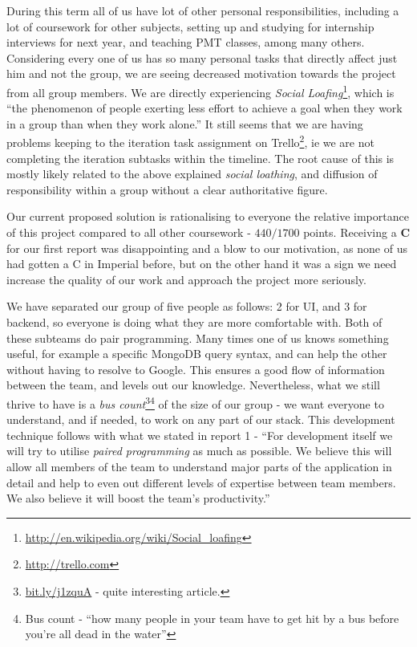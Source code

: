 \documentclass[a4paper,12pt]{article}
\begin{document}
	During this term all of us have lot of other personal responsibilities, including a lot of coursework for other subjects, setting up and studying for internship interviews for next year, and teaching PMT classes, among many others. Considering every one of us has so many personal tasks that directly affect just him and not the group, we are seeing decreased motivation towards the project from all group members. We are directly experiencing \emph{Social Loafing}\footnote{\url{http://en.wikipedia.org/wiki/Social_loafing}}, which is ``the phenomenon of people exerting less effort to achieve a goal when they work in a group than when they work alone.'' It still seems that we are having problems keeping to the iteration task assignment on Trello\footnote{\url{http://trello.com}}, ie we are not completing the iteration subtasks within the timeline. The root cause of this is mostly likely related to the above explained \emph{social loathing}, and diffusion of responsibility within a group without a clear authoritative figure.
	
	Our current proposed solution is rationalising to everyone the relative importance of this project compared to all other coursework - $440/1700$ points. Receiving a \textbf{C} for our first report was disappointing and a blow to our motivation, as none of us had gotten a C in Imperial before, but on the other hand it was a sign we need increase the quality of our work and approach the project more seriously.
	
	We have separated our group of five people as follows: 2 for UI, and 3 for backend, so everyone is doing what they are more comfortable with. Both of these subteams do pair programming. Many times one of us knows something useful, for example a specific MongoDB query syntax, and can help the other without having to resolve to Google. This ensures a good flow of information between the team, and levels out our knowledge. Nevertheless, what we still thrive to have is a \emph{bus count}\footnote{\url{bit.ly/j1zquA} - quite interesting article.}\footnote{Bus count - ``how many people in your team have to get hit by a bus before you’re all dead in the water''} of the size of our group - we want everyone to understand, and if needed, to work on any part of our stack. This development technique follows with what we stated in report 1 - ``For development itself we will try to utilise \emph{paired programming} as much as possible. We believe this will allow all members of the team to understand major parts of the application in detail and help to even out different levels of expertise between team members. We also believe it will boost the team's productivity.''
	
\end{document}
